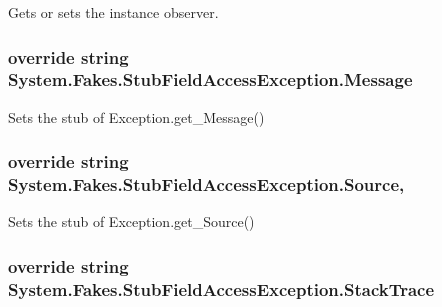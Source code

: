 Gets or sets the instance observer.

\hypertarget{class_system_1_1_fakes_1_1_stub_field_access_exception_ad4680367356e0a7168a414965f639a9f}{
\subsubsection[{Message}]{\setlength{\rightskip}{0pt plus 5cm}override string System.\-Fakes.\-Stub\-Field\-Access\-Exception.\-Message\hspace{0.3cm}{\ttfamily [get]}}}\label{class_system_1_1_fakes_1_1_stub_field_access_exception_ad4680367356e0a7168a414965f639a9f}


Sets the stub of Exception.\-get\-\_\-\-Message()

\hypertarget{class_system_1_1_fakes_1_1_stub_field_access_exception_ae813ee9977be20e0c838de477ef13f41}{
\subsubsection[{Source}]{\setlength{\rightskip}{0pt plus 5cm}override string System.\-Fakes.\-Stub\-Field\-Access\-Exception.\-Source\hspace{0.3cm}{\ttfamily [get]}, {\ttfamily [set]}}}\label{class_system_1_1_fakes_1_1_stub_field_access_exception_ae813ee9977be20e0c838de477ef13f41}


Sets the stub of Exception.\-get\-\_\-\-Source()

\hypertarget{class_system_1_1_fakes_1_1_stub_field_access_exception_afcf3bd6350e2ec443cf3b67778be3a7c}{
\subsubsection[{Stack\-Trace}]{\setlength{\rightskip}{0pt plus 5cm}override string System.\-Fakes.\-Stub\-Field\-Access\-Exception.\-Stack\-Trace\hspace{0.3cm}{\ttfamily [get]}}}\label{class_system_1_1_fakes_1_1_stub_field_access_exception_afcf3bd6350e2ec443cf3b67778be3a7c}


